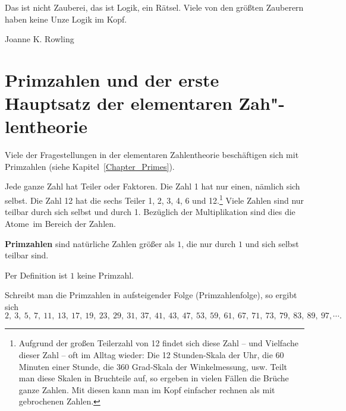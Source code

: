 \begin{refsegment}
\newpage
\begin{ctsquote}
Das ist nicht Zauberei, das ist Logik, ein Rätsel.
Viele von den größten Zauberern haben keine Unze Logik im Kopf.
\caption[Joanne K. Rowling]{Joanne K. Rowling\footnotemark}
\end{ctsquote}
\addtocounter{footnote}{0}


\section[Primzahlen und der erste Hauptsatz der elementaren Zahlentheorie]
        {Primzahlen und der erste Hauptsatz der elementaren Zah"-lentheorie}
Viele der Fragestellungen in der elementaren Zahlentheorie beschäftigen sich
mit Primzahlen (siehe Kapitel~\ref{Chapter_Primes}).

Jede ganze Zahl hat Teiler oder Faktoren. Die Zahl 1 hat nur einen, nämlich
sich selbst. Die Zahl 12 hat die sechs Teiler 1, 2, 3, 4, 6 und 12.\footnote{%
  Aufgrund der großen Teilerzahl von 12 findet sich diese Zahl -- und Vielfache
  dieser Zahl -- oft im Alltag wieder:
  Die 12 Stunden-Skala der Uhr, die 60 Minuten einer Stunde, die 360 Grad-Skala
  der Winkelmessung, usw. Teilt man diese Skalen in Bruchteile auf, so ergeben
  in vielen Fällen die Brüche ganze Zahlen. Mit diesen kann
  man im Kopf einfacher rechnen als mit gebrochenen Zahlen.
}
Viele Zahlen sind nur teilbar durch sich selbst und durch 1. Bezüglich der
Multiplikation sind dies die \glqq Atome\grqq~im Bereich der Zahlen.

\begin{definition}\label{def-zth-prime}
{\bf Primzahlen} sind natürliche Zahlen größer als $1$, die nur durch $1$ und sich
selbst teilbar sind.
\end{definition}

Per Definition ist $1$ keine Primzahl.

Schreibt man die Primzahlen in aufsteigender Folge (Primzahlenfolge), so
ergibt sich
$$2,~ 3,~ 5,~ 7,~ 11, ~13,~ 17,~ 19, ~23, ~29, ~31, ~37,~ 41,~ 43,~ 47,~ 53, ~59, ~61, ~67, ~71,
~73, ~79, ~83, ~89, ~97, \cdots.$$


\end{refsegment}
